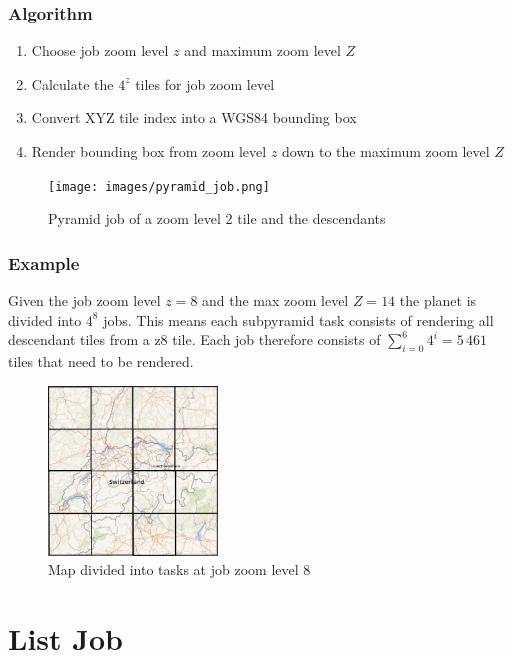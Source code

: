 \subsubsection*{Algorithm}

\begin{enumerate}  
    \item Choose job zoom level $z$ and maximum zoom level $Z$
    \item Calculate the $4^z$ tiles for job zoom level
    \item Convert XYZ tile index into a WGS84 bounding box
    \item Render bounding box from zoom level $z$ down to the maximum zoom level $Z$
\end{enumerate}

\begin{figure}[H]
  \centering
  \texttt{[image: images/pyramid\_job.png]}
  \caption{Pyramid job of a zoom level 2 tile and the descendants}
\end{figure}

\subsubsection*{Example}

Given the job zoom level $z=8$ and the max zoom level $Z=14$ the planet is divided into $4^{8}$ jobs.
This means each subpyramid task consists of rendering all descendant tiles from a z8 tile.
Each job therefore consists of $\sum_{i=0}^{6} 4^i = 5\,461$ tiles that need to be rendered.  \\

\begin{figure}[H]
  \centering
  \includegraphics[width=0.4\textwidth]{images/switzerland_tiled_z8_small.png}
  \caption{Map divided into tasks at job zoom level 8}
\end{figure}

\section{List Job}\label{list-job}

